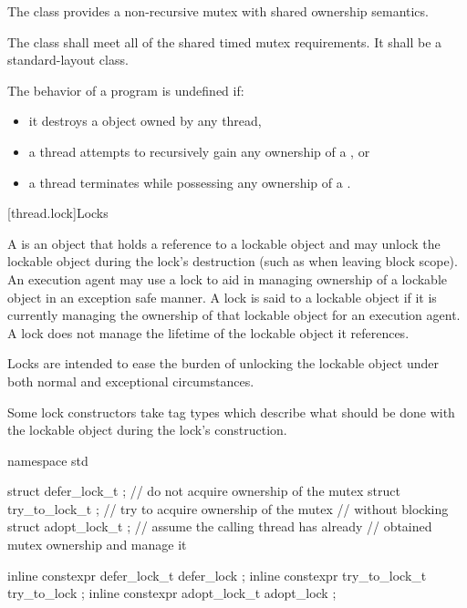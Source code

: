 \pnum
The class  provides a non-recursive mutex with shared
ownership semantics.

\pnum
The class  shall meet all of the
shared timed mutex requirements.
It shall be a standard-layout class.

\pnum
The behavior of a program is undefined if:
\begin{itemize}
\item it destroys a  object owned by any thread,
\item a thread attempts to recursively gain any ownership of a , or
\item a thread terminates while possessing any ownership of a .
\end{itemize}

[thread.lock]{Locks}

\pnum
A  is an object that holds a reference to a lockable object and may unlock the
lockable object during the lock's destruction (such as when leaving block scope). An execution
agent may use a lock to aid in managing ownership of a lockable object in an exception safe
manner. A lock is said to  a lockable object if it is currently managing the
ownership of that lockable object for an execution agent. A lock does not manage the lifetime
of the lockable object it references.
\begin{note}
Locks are intended to ease the burden of
unlocking the lockable object under both normal and exceptional circumstances.
\end{note}

\pnum
Some lock constructors take tag types which describe what should be done with the lockable
object during the lock's construction.

%
%
%
%
%
%
\begin{codeblock}
namespace std {
  struct defer_lock_t  { };     // do not acquire ownership of the mutex
  struct try_to_lock_t { };     // try to acquire ownership of the mutex
                                // without blocking
  struct adopt_lock_t  { };     // assume the calling thread has already
                                // obtained mutex ownership and manage it

  inline constexpr defer_lock_t   defer_lock { };
  inline constexpr try_to_lock_t  try_to_lock { };
  inline constexpr adopt_lock_t   adopt_lock { };
}
\end{codeblock}

